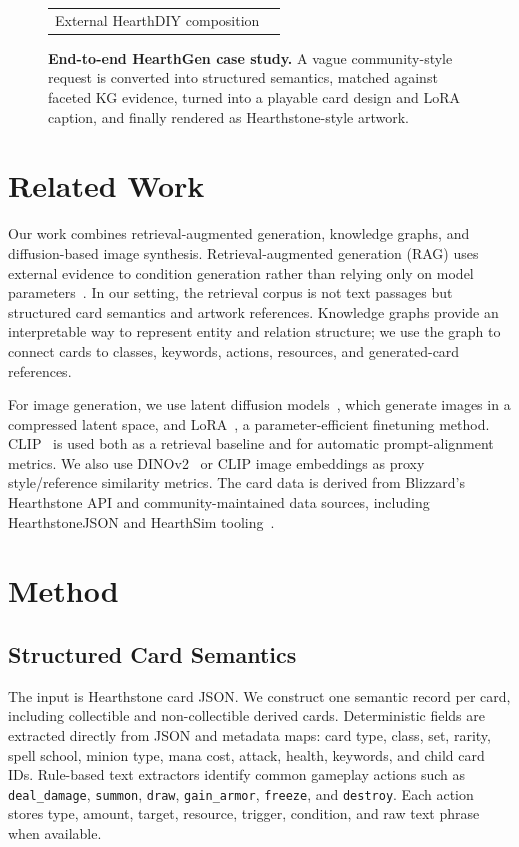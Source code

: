 \documentclass[10pt,twocolumn,letterpaper]{article}
\begin{document}
\begin{figure}[t]
\begin{tabular}{p{}p{}}
\begin{minipage}[t]{0.47\textwidth}
{\scriptsize External HearthDIY composition}
\end{minipage}
\end{tabular}
\caption{\textbf{End-to-end HearthGen case study.} A vague community-style request is converted into structured semantics, matched against faceted KG evidence, turned into a playable card design and LoRA caption, and finally rendered as Hearthstone-style artwork.}
\label{fig:overview}
\end{figure}


\section{Related Work}

Our work combines retrieval-augmented generation, knowledge graphs, and diffusion-based image synthesis. Retrieval-augmented generation (RAG) uses external evidence to condition generation rather than relying only on model parameters~\cite{lewis2020rag}. In our setting, the retrieval corpus is not text passages but structured card semantics and artwork references. Knowledge graphs provide an interpretable way to represent entity and relation structure; we use the graph to connect cards to classes, keywords, actions, resources, and generated-card references.

For image generation, we use latent diffusion models~\cite{rombach2022ldm}, which generate images in a compressed latent space, and LoRA~\cite{hu2021lora}, a parameter-efficient finetuning method. CLIP~\cite{radford2021clip} is used both as a retrieval baseline and for automatic prompt-alignment metrics. We also use DINOv2~\cite{oquab2023dinov2} or CLIP image embeddings as proxy style/reference similarity metrics. The card data is derived from Blizzard's Hearthstone API and community-maintained data sources, including HearthstoneJSON and HearthSim tooling~\cite{hearthstoneapi,hearthstonejson,hearthsim}.




\section{Method}

\subsection{Structured Card Semantics}

The input is Hearthstone card JSON. We construct one semantic record per card, including collectible and non-collectible derived cards. Deterministic fields are extracted directly from JSON and metadata maps: card type, class, set, rarity, spell school, minion type, mana cost, attack, health, keywords, and child card IDs. Rule-based text extractors identify common gameplay actions such as \texttt{deal\_damage}, \texttt{summon}, \texttt{draw}, \texttt{gain\_armor}, \texttt{freeze}, and \texttt{destroy}. Each action stores type, amount, target, resource, trigger, condition, and raw text phrase when available.
\end{document}
